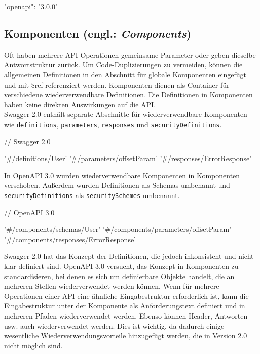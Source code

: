 \begin{LaTeXCode}[caption={Version von Open API},captionpos=b, label=LaTeXCode:openapi3.0-1][numbers=none]
"openapi": "3.0.0"\\
\end{LaTeXCode}

\subsection{Komponenten (engl.: \textit{Components})}

Oft haben mehrere API-Operationen gemeinsame Parameter oder geben dieselbe Antwortstruktur zurück. Um Code-Duplizierungen zu vermeiden, können die allgemeinen Definitionen in den Abschnitt für globale Komponenten eingefügt und mit \$ref referenziert werden. Komponenten dienen als Container für verschiedene wiederverwendbare Definitionen. Die Definitionen in Komponenten haben keine direkten Auswirkungen auf die API\cite{openapicomponents17}.\\

Swagger 2.0 enthält separate Abschnitte für wiederverwendbare Komponenten wie \texttt{definitions}, \texttt{parameters}, \texttt{responses} und \texttt{securityDefinitions}\cite{swagger20Github}.\\

\begin{LaTeXCode}[caption={Open API 2.0 - Komponenten\cite{openapicomponents17}},captionpos=b, label=LaTeXCode:openapi3.0-2][numbers=none]
// Swagger 2.0    

'#/definitions/User'
'#/parameters/offsetParam'
'#/responses/ErrorResponse'
\end{LaTeXCode}

In OpenAPI 3.0 wurden wiederverwendbare Komponenten in Komponenten verschoben. Außerdem wurden Definitionen als Schemas umbenannt und \texttt{securityDefinitions} als \texttt{securitySchemes} umbenannt\cite{openapi20Github}.\\

\begin{LaTeXCode}[caption={Open API 3.0 - Komponenten\cite{openapicomponents17}},captionpos=b, label=LaTeXCode:openapi3.0-3][numbers=none]
// OpenAPI 3.0

'#/components/schemas/User'
'#/components/parameters/offsetParam'
'#/components/responses/ErrorResponse'
\end{LaTeXCode}

Swagger 2.0 hat das Konzept der Definitionen, die jedoch inkonsistent und nicht klar definiert sind. OpenAPI 3.0 versucht, das Konzept in Komponenten zu standardisieren, bei denen es sich um definierbare Objekte handelt, die an mehreren Stellen wiederverwendet werden können. Wenn für mehrere Operationen einer API eine ähnliche Eingabestruktur erforderlich ist, kann die Eingabestruktur unter der Komponente als Anforderungstext definiert und in mehreren Pfaden wiederverwendet werden. Ebenso können Header, Antworten usw. auch wiederverwendet werden. Dies ist wichtig, da dadurch einige wesentliche Wiederverwendungsvorteile hinzugefügt werden, die in Version 2.0 nicht möglich sind\cite{swagger20Github, openapi20Github}.\\

